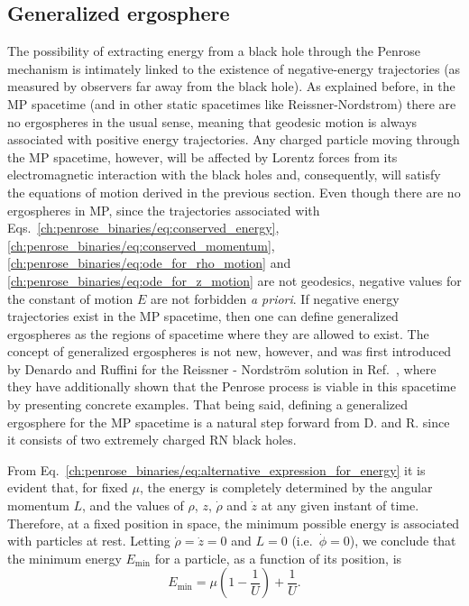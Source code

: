 \subsection{Generalized ergosphere}

The possibility of extracting energy from a black hole through the Penrose mechanism is intimately linked to the existence of negative-energy trajectories (as measured by observers far away from the black hole). As explained before, in the MP spacetime (and in other static spacetimes like Reissner-Nordstrom) there are no ergospheres in the usual sense, meaning that geodesic motion is always associated with positive energy trajectories. Any charged particle moving through the MP spacetime, however, will be affected by Lorentz forces from its electromagnetic interaction with the black holes and, consequently, will satisfy the equations of motion derived in the previous section. Even though there are no ergospheres in MP, since the trajectories associated with Eqs.~\eqref{ch:penrose_binaries/eq:conserved_energy}, \eqref{ch:penrose_binaries/eq:conserved_momentum}, \eqref{ch:penrose_binaries/eq:ode_for_rho_motion} and \eqref{ch:penrose_binaries/eq:ode_for_z_motion} are not geodesics, negative values for the constant of motion $E$ are not forbidden \emph{a priori}. If negative energy trajectories exist in the MP spacetime, then one can define generalized ergospheres as the regions of spacetime where they are allowed to exist. The concept of generalized ergospheres is not new, however, and was first introduced by Denardo and Ruffini for the Reissner - Nordstr\"om solution in Ref.~\cite{DENARDO1973}, where they have additionally shown that the Penrose process is viable in this spacetime by presenting concrete examples. That being said, defining a generalized ergosphere for the MP spacetime is a natural step forward from D. and R. since it consists of two extremely charged RN black holes.

From Eq.~\eqref{ch:penrose_binaries/eq:alternative_expression_for_energy} it is evident that, for fixed $\mu$, the energy is completely determined by the angular momentum $L$, and the values of $\rho$, $z$, $\dot{\rho}$ and $\dot{z}$  at any given instant of time. Therefore, at a fixed position in space, the minimum possible energy is associated with particles at rest. Letting $\dot{\rho}=\dot{z}=0$ and $L=0$ (i.e.~$\dot{\phi}=0$), we conclude that the minimum energy $E_{\mathrm{min}}$ for a particle, as a function of its position, is
\begin{equation} \label{ch:penrose_binaries/eq:minimum_energy}
    E_{\mathrm{min}} = \mu\left(1-\frac{1}{U}\right) + \frac{1}{U}.
\end{equation}

